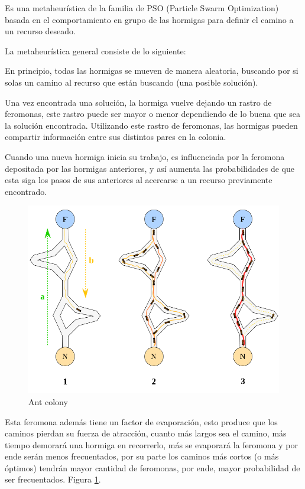 \documentclass[a4paper,spanish]{article}
\begin{document}
Es una metaheurística de la familia de PSO (Particle Swarm Optimization) basada en el
comportamiento en grupo de las hormigas para definir el camino a un recurso deseado.

La metaheurística general consiste de lo siguiente:

En principio, todas las hormigas se mueven de manera aleatoria, buscando por si solas
un camino al recurso que están buscando (una posible solución).

Una vez encontrada una solución, la hormiga vuelve dejando un rastro de feromonas, 
este rastro puede ser mayor o menor dependiendo de lo buena que sea la solución encontrada.
Utilizando este rastro de feromonas, las hormigas pueden compartir información entre sus
distintos pares en la colonia. 

Cuando una nueva hormiga inicia su trabajo, es influenciada por la feromona depositada por
las hormigas anteriores, y así aumenta las probabilidades de que esta siga los pasos de sus
anteriores al acercarse a un recurso previamente encontrado.

\begin{figure}[h]
	\centering
	\includegraphics[scale=0.2]{./img/antscolonyalg.png}
	\caption{Ant colony}
	\label{img:ants}
\end{figure}

Esta feromona además tiene un factor de evaporación, esto produce que los caminos pierdan
su fuerza de atracción, cuanto más largos sea el camino, más tiempo demorará una hormiga
en recorrerlo, más se evaporará la feromona y por ende serán menos frecuentados, por su parte
los caminos más cortos (o más óptimos) tendrán mayor cantidad de feromonas, por ende, mayor
probabilidad de ser frecuentados. Figura \ref{img:ants}.
\end{document}
